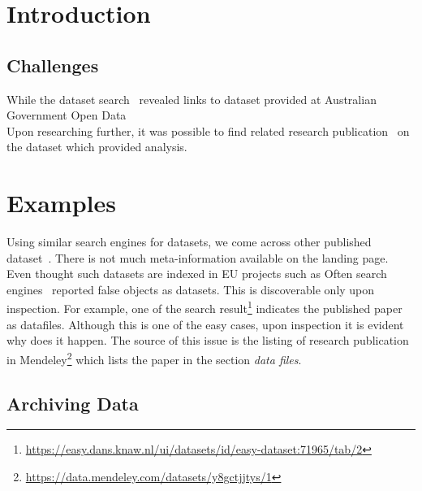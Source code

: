 \documentclass[12pt]{elsarticle}
\begin{document}
\section*{Introduction}
\subsection*{Challenges}
While the dataset search~\cite{gdataset} revealed links to dataset provided at Australian Government Open Data~\cite{auopendata}
\\
Upon researching further, it was possible to find related research publication~\cite{molster2007community} on the dataset which provided analysis. 
\section*{Examples}
Using similar search engines for datasets, we come across other published dataset~\cite{jim_2015_35012}. 
There is not much meta-information available on the landing page. 
Even thought such datasets are indexed in EU projects such as 
Often search engines~\cite{dansNL} reported false objects as datasets. 
This is discoverable only upon inspection. 
For example, one of the search result\footnote{\url{https://easy.dans.knaw.nl/ui/datasets/id/easy-dataset:71965/tab/2}} indicates the published paper as datafiles. 
Although this is one of the easy cases, upon inspection it is evident why does it happen. 
The source of this issue is the listing of research publication in Mendeley\footnote{\url{https://data.mendeley.com/datasets/y8gctjjtys/1}} which lists the paper in the section \textit{data files}.
\subsection*{Archiving Data}










\end{document}
